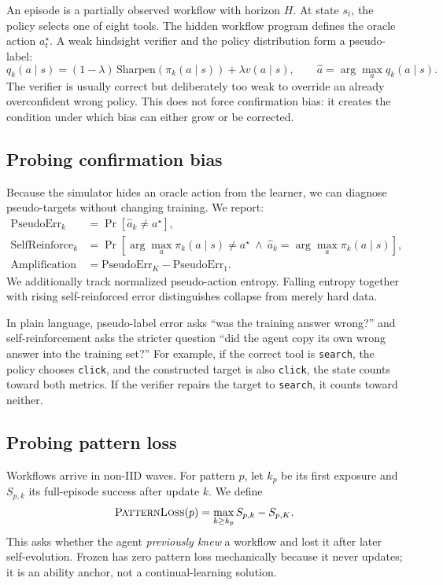 \documentclass[10pt]{article}
\newcommand{\ploss}{\textsc{PatternLoss}}
\begin{document}
An episode is a partially observed workflow with horizon $H$.  At state $s_t$,
the policy selects one of eight tools.  The hidden workflow program defines the
oracle action $a_t^\star$.  A weak hindsight verifier and the policy distribution
form a pseudo-label:
\begin{equation}
 q_k(a\mid s)=(1-\lambda)\,
 \mathrm{Sharpen}(\pi_k(a\mid s))+\lambda v(a\mid s),\qquad
 \hat a=\arg\max_a q_k(a\mid s).
\end{equation}
The verifier is usually correct but deliberately too weak to override an
already overconfident wrong policy.  This does not force confirmation bias:
it creates the condition under which bias can either grow or be corrected.

\subsection{Probing confirmation bias}

Because the simulator hides an oracle action from the learner, we can diagnose
pseudo-targets without changing training.  We report:
\begin{align}
\mathrm{PseudoErr}_k
 &= \Pr[\hat a_k\neq a^\star],\\
\mathrm{SelfReinforce}_k
 &= \Pr[\arg\max_a\pi_k(a\mid s)\neq a^\star
 \ \wedge\ \hat a_k=\arg\max_a\pi_k(a\mid s)],\\
\mathrm{Amplification}
 &= \mathrm{PseudoErr}_{K}-\mathrm{PseudoErr}_{1}.
\end{align}
We additionally track normalized pseudo-action entropy.  Falling entropy
together with rising self-reinforced error distinguishes collapse from merely
hard data.

In plain language, pseudo-label error asks ``was the training answer wrong?''
and self-reinforcement asks the stricter question ``did the agent copy its own
wrong answer into the training set?''  For example, if the correct tool is
\texttt{search}, the policy chooses \texttt{click}, and the constructed target
is also \texttt{click}, the state counts toward both metrics.  If the verifier
repairs the target to \texttt{search}, it counts toward neither.

\subsection{Probing pattern loss}

Workflows arrive in non-IID waves.  For pattern $p$, let $k_p$ be its first
exposure and $S_{p,k}$ its full-episode success after update $k$.  We define
\begin{equation}
 \mathrm{\ploss}(p)=\max_{k\ge k_p} S_{p,k}-S_{p,K}.
\end{equation}
This asks whether the agent \emph{previously knew} a workflow and lost it after
later self-evolution.  Frozen has zero pattern loss mechanically because it
never updates; it is an ability anchor, not a continual-learning solution.
\end{document}
